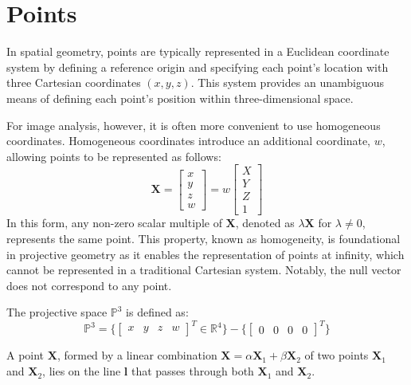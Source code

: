\section{Points}

In spatial geometry, points are typically represented in a Euclidean coordinate system by defining a reference origin and specifying each point's location with three Cartesian coordinates $(x, y, z)$.
This system provides an unambiguous means of defining each point's position within three-dimensional space.

For image analysis, however, it is often more convenient to use homogeneous coordinates. 
Homogeneous coordinates introduce an additional coordinate, $w$, allowing points to be represented as follows: 
\[\mathbf{X} = \begin{bmatrix} x \\ y \\ z \\ w \end{bmatrix} = w\begin{bmatrix} X \\ Y \\ Z \\ 1 \end{bmatrix}\]
In this form, any non-zero scalar multiple of $\mathbf{X}$, denoted as $\lambda\mathbf{X}$ for $\lambda \neq 0$, represents the same point.
This property, known as homogeneity, is foundational in projective geometry as it enables the representation of points at infinity, which cannot be represented in a traditional Cartesian system.
Notably, the null vector does not correspond to any point.
\begin{definition}
    The projective space $\mathbb{P}^3$ is defined as:
    \[\mathbb{P}^3=\{{\begin{bmatrix} x & y & z & w \end{bmatrix}}^T \in \mathbb{R}^4\}-\{{\begin{bmatrix} 0 & 0 & 0 & 0 \end{bmatrix}}^T\}\]
\end{definition}
\begin{property}
    A point $\mathbf{X}$, formed by a linear combination $\mathbf{X}=\alpha\mathbf{X}_1+\beta\mathbf{X}_2$ of two points $\mathbf{X}_1$ and $\mathbf{X}_2$, lies on the line $\mathbf{l}$ that passes through both $\mathbf{X}_1$ and $\mathbf{X}_2$.
\end{property}